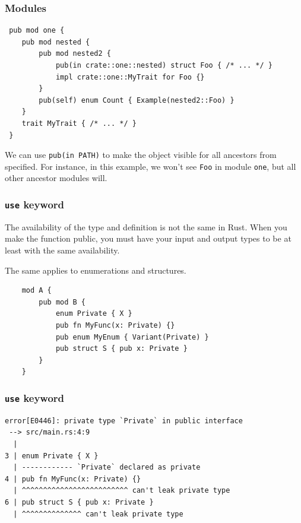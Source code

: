 \documentclass[aspectratio=1610,t]{beamer}
\begin{document}

\begin{frame}[fragile]
\frametitle{Modules}
\begin{verbatim}
 pub mod one {
    pub mod nested {
        pub mod nested2 {
            pub(in crate::one::nested) struct Foo { /* ... */ }
            impl crate::one::MyTrait for Foo {}
        }
        pub(self) enum Count { Example(nested2::Foo) }
    }
    trait MyTrait { /* ... */ }
 }
\end{verbatim}

We can use \texttt{pub(in PATH)} to make the object visible for all ancestors from specified. For instance, in this example, we won't see \texttt{Foo} in module \texttt{one}, but all other ancestor modules will.
\end{frame}


\begin{frame}[fragile]
\frametitle{\texttt{use} keyword}
The availability of the type and definition is not the same in Rust. When you make the function public, you must have your input and output types to be at least with the same availability.

The same applies to enumerations and structures.

\begin{verbatim}
    mod A {
        pub mod B {
            enum Private { X }
            pub fn MyFunc(x: Private) {}
            pub enum MyEnum { Variant(Private) }
            pub struct S { pub x: Private }
        }
    }
\end{verbatim}
\end{frame}


\begin{frame}[fragile]
\frametitle{\texttt{use} keyword}
\begin{verbatim}
error[E0446]: private type `Private` in public interface
 --> src/main.rs:4:9
  |
3 | enum Private { X }
  | ------------ `Private` declared as private
4 | pub fn MyFunc(x: Private) {}
  | ^^^^^^^^^^^^^^^^^^^^^^^^^ can't leak private type
6 | pub struct S { pub x: Private }
  | ^^^^^^^^^^^^^^ can't leak private type
\end{verbatim}
\end{frame}
\end{document}
